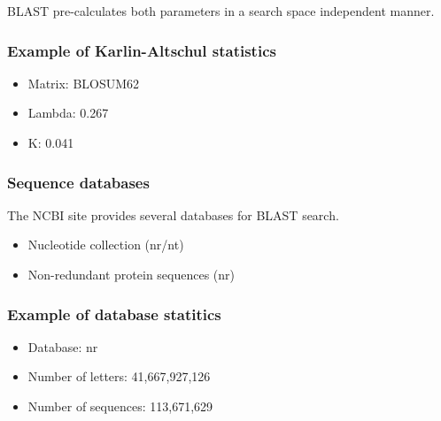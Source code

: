 BLAST pre-calculates both parameters in a search space independent manner.

%
%
\subsubsection*{Example of Karlin-Altschul statistics} 
\begin{itemize}
\item Matrix: BLOSUM62
\item Lambda: 0.267
\item K: 0.041
\end{itemize}

%
%
\subsubsection*{Sequence databases} 
The NCBI site provides several databases for BLAST search.
\begin{itemize}
\item Nucleotide collection (nr/nt)
\item Non-redundant protein sequences (nr)
\end{itemize}

%
%
\subsubsection*{Example of  database statitics} 
\begin{itemize}
\item Database: nr
\item Number of letters: 41,667,927,126
\item Number of sequences: 113,671,629
\end{itemize}

\bigskip 

%
